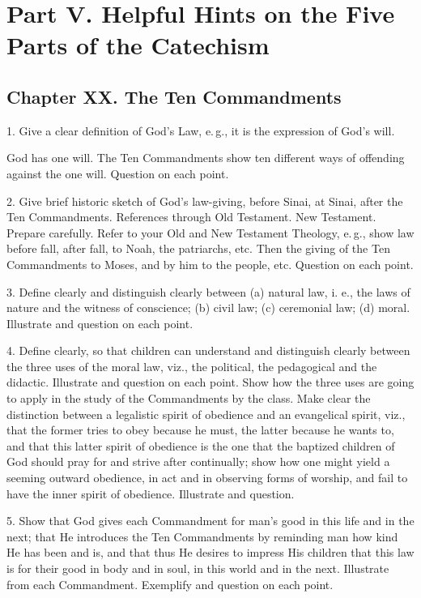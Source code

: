 \part[Part V. Helpful Hints]{Part V. Helpful Hints on the Five Parts of the Catechism}

\chapter{Chapter XX. The Ten Commandments}

 1. Give a clear definition of God’s Law, e.\,g., it is the expression of God’s will.

God has one will. The Ten Commandments show ten different ways of offending against the one will. Question on each point.

 2. Give brief historic sketch of God’s law-giving, before Sinai, at Sinai, after the Ten Commandments. References through Old Testament. New Testament. Prepare carefully. Refer to your Old and New Testament Theology, e.\,g., show law before fall, after fall, to Noah, the patriarchs, etc. Then the giving of the Ten Commandments to Moses, and by him to the people, etc. Question on each point.

 3. Define clearly and distinguish clearly between (a) natural law, i. e., the laws of nature and the witness of conscience; (b) civil law; (c) ceremonial law; (d) moral. Illustrate and question on each point.

 4. Define clearly, so that children can understand and distinguish clearly between the three uses of the moral law, viz., the political, the pedagogical and the didactic. Illustrate and question on each point.
Show how the three uses are going to apply in the study of the Commandments by the class. Make clear the distinction between a legalistic spirit of obedience and an evangelical spirit, viz., that the former tries to obey because he must, the latter because he wants to, and that this latter spirit of obedience is the one that the baptized children of God should pray for and strive after continually; show how one might yield a seeming outward obedience, in act and in observing forms of worship, and fail to have the inner spirit of obedience. Illustrate and question.

 5. Show that God gives each Commandment for man’s good in this life and in the next; that He introduces the Ten Commandments by reminding man how kind He has been and is, and that thus He desires to impress His children that this law is for their good in body and in soul, in this world and in the next. Illustrate from each Commandment. Exemplify and question on each point.

